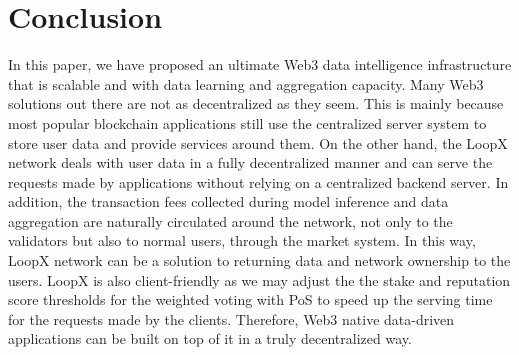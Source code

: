 \documentclass[11pt,letterpaper]{article}
\begin{document}
\section{Conclusion}
In this paper, we have proposed an ultimate Web3 data intelligence infrastructure that is scalable and with data learning and aggregation capacity. Many Web3 solutions out there are not as decentralized as they seem. This is mainly because most popular blockchain applications still use the centralized server system to store user data and provide services around them. On the other hand, the LoopX network deals with user data in a fully decentralized manner and can serve the requests made by applications without relying on a centralized backend server. In addition, the transaction fees collected during model inference and data aggregation are naturally circulated around the network, not only to the validators but also to normal users, through the market system. In this way, LoopX network can be a solution to returning data and network ownership to the users. LoopX is also client-friendly as we may adjust the the stake and reputation score thresholds for the weighted voting with PoS to speed up the serving time for the requests made by the clients. Therefore, Web3 native data-driven applications can be built on top of it in a truly decentralized way.



\end{document}

